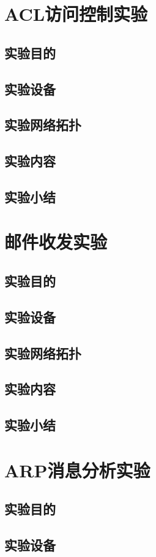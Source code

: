 \documentclass[lang=cn,11pt,a4paper,cite=authoryear]{elegantpaper}
\begin{document}
\section{ACL访问控制实验}
\subsection{实验目的}
\subsection{实验设备}
\subsection{实验网络拓扑}
\subsection{实验内容}
\subsection{实验小结}
\section{邮件收发实验}
\subsection{实验目的}
\subsection{实验设备}
\subsection{实验网络拓扑}
\subsection{实验内容}
\subsection{实验小结}
\section{ARP消息分析实验}
\subsection{实验目的}
\subsection{实验设备}
\end{document}

